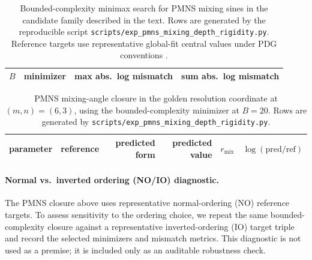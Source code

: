 \begin{table}[t]
\centering
\small
\setlength{\tabcolsep}{6pt}
\renewcommand{\arraystretch}{1.15}
\begin{tabular}{rllr}
\toprule
$B$ & minimizer & max abs.\ log mismatch & sum abs.\ log mismatch \\
\midrule
%
\end{tabular}
\caption{Bounded-complexity minimax search for PMNS mixing sines in the candidate family described in the text. Rows are generated by the reproducible script \texttt{scripts/exp\_pmns\_mixing\_depth\_rigidity.py}. Reference targets use representative global-fit central values under PDG conventions \cite{PDGRPP2024,Esteban2020NuFIT}.}
\label{tab:pmns_mixing_rigidity}
\end{table}

\begin{table}[t]
\centering
\small
\setlength{\tabcolsep}{6pt}
\renewcommand{\arraystretch}{1.15}
\begin{tabular}{lrrrrr}
\toprule
parameter & reference & predicted form & predicted value & $r_{\mathrm{mix}}$ & $\log(\mathrm{pred}/\mathrm{ref})$ \\
\midrule
%
\end{tabular}
\caption{PMNS mixing-angle closure in the golden resolution coordinate at $(m,n)=(6,3)$, using the bounded-complexity minimizer at $B=20$. Rows are generated by \texttt{scripts/exp\_pmns\_mixing\_depth\_rigidity.py}.}
\label{tab:pmns_mixing}
\end{table}

\paragraph{Normal vs.\ inverted ordering (NO/IO) diagnostic.}
The PMNS closure above uses representative normal-ordering (NO) reference targets.
To assess sensitivity to the ordering choice, we repeat the same bounded-complexity closure against a representative inverted-ordering (IO) target triple and record the selected minimizers and mismatch metrics.
This diagnostic is not used as a premise; it is included only as an auditable robustness check.

